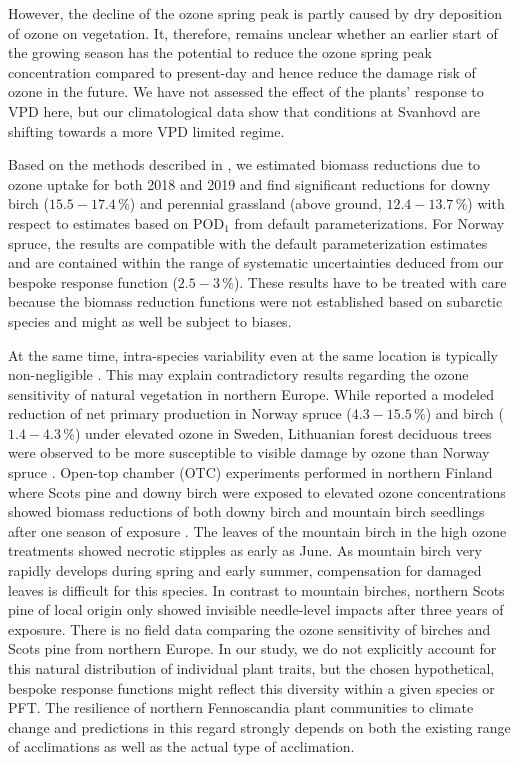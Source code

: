\documentclass[bg, manuscript]{copernicus}
\begin{document}
However, the decline of the ozone spring peak is partly caused by dry deposition of ozone on vegetation. It, therefore, remains unclear whether an earlier start of the growing season has the potential to reduce the ozone spring peak concentration compared to present-day and hence reduce the damage risk of ozone in the future. 
We have not assessed the effect of the plants' response to VPD here, but our climatological data show that conditions at Svanhovd are shifting towards a more VPD limited regime.
 
Based on the methods described in \citet{ICP:MappingManual2017}, we estimated biomass reductions due to ozone uptake for both 2018 and 2019 and find significant reductions for downy birch ($15.5-17.4\,\unit{\%}$) and perennial grassland (above ground, $12.4-13.7\,\unit{\%}$) with respect to estimates based on $\mathrm{POD_1}$ from default parameterizations. For Norway spruce, the results are compatible with the default parameterization estimates and are contained within the range of systematic uncertainties deduced from our bespoke response function ($2.5-3\,\unit{\%}$). These results have to be treated with care because the biomass reduction functions were not established based on subarctic species and might as well be subject to biases.  

At the same time, intra-species variability even at the same location is typically non-negligible \citep{EP:Bassin2004,Amb:Girgzdiene2009}. This may explain contradictory results regarding the ozone sensitivity of natural vegetation in northern Europe. While \citet{FS:Subramanian2014} reported a modeled reduction of net primary production in Norway spruce ($4.3-15.5\,\unit{\%}$) and birch ($1.4-4.3\,\unit{\%}$) under elevated ozone in Sweden, Lithuanian forest deciduous trees were observed to be more susceptible to visible damage by ozone than Norway spruce \citep{Amb:Girgzdiene2009}. Open-top chamber (OTC) experiments performed in northern Finland where Scots pine and downy birch were exposed to elevated ozone concentrations showed biomass reductions of both downy birch and mountain birch seedlings after one season of exposure \citep{Amb:Manninen2009}. The leaves of the mountain birch in the high ozone treatments showed necrotic stipples as early as June. As mountain birch very rapidly develops during spring and early summer, compensation for damaged leaves is difficult for this species. In contrast to mountain birches, northern Scots pine of local origin only showed invisible needle-level  impacts after three years of exposure. There is no field data comparing the ozone sensitivity of birches and Scots pine from northern Europe.
In our study, we do not explicitly account for this natural distribution of individual plant traits, but the chosen hypothetical, bespoke response functions might reflect this diversity within a given species or PFT. The resilience of northern Fennoscandia plant communities to climate change and predictions in this regard strongly depends on both the existing range of acclimations as well as the actual type of acclimation. 
\end{document}
